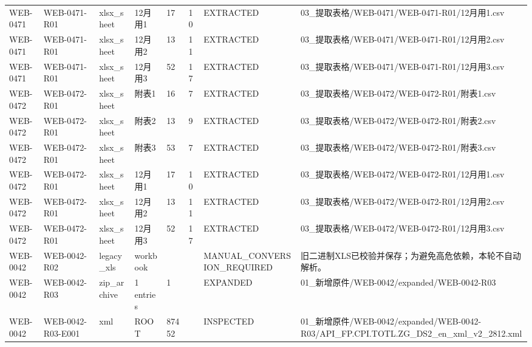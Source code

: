 \begin{landscape}
\begin{longtable}{p{1.8cm}p{2.2cm}p{3.1cm}p{4.7cm}p{1.3cm}p{1.3cm}p{3.0cm}p{5.3cm}}
WEB-0471 & WEB-0471-R01 & xlsx\_\allowbreak{}sheet & 12月用1 & 17 & 10 & EXTRACTED & 03\_\allowbreak{}提取表格/\allowbreak{}WEB-0471/\allowbreak{}WEB-0471-R01/\allowbreak{}12月用1.csv\\
WEB-0471 & WEB-0471-R01 & xlsx\_\allowbreak{}sheet & 12月用2 & 13 & 11 & EXTRACTED & 03\_\allowbreak{}提取表格/\allowbreak{}WEB-0471/\allowbreak{}WEB-0471-R01/\allowbreak{}12月用2.csv\\
WEB-0471 & WEB-0471-R01 & xlsx\_\allowbreak{}sheet & 12月用3 & 52 & 17 & EXTRACTED & 03\_\allowbreak{}提取表格/\allowbreak{}WEB-0471/\allowbreak{}WEB-0471-R01/\allowbreak{}12月用3.csv\\
WEB-0472 & WEB-0472-R01 & xlsx\_\allowbreak{}sheet & 附表1 & 16 & 7 & EXTRACTED & 03\_\allowbreak{}提取表格/\allowbreak{}WEB-0472/\allowbreak{}WEB-0472-R01/\allowbreak{}附表1.csv\\
WEB-0472 & WEB-0472-R01 & xlsx\_\allowbreak{}sheet & 附表2 & 13 & 9 & EXTRACTED & 03\_\allowbreak{}提取表格/\allowbreak{}WEB-0472/\allowbreak{}WEB-0472-R01/\allowbreak{}附表2.csv\\
WEB-0472 & WEB-0472-R01 & xlsx\_\allowbreak{}sheet & 附表3 & 53 & 7 & EXTRACTED & 03\_\allowbreak{}提取表格/\allowbreak{}WEB-0472/\allowbreak{}WEB-0472-R01/\allowbreak{}附表3.csv\\
WEB-0472 & WEB-0472-R01 & xlsx\_\allowbreak{}sheet & 12月用1 & 17 & 10 & EXTRACTED & 03\_\allowbreak{}提取表格/\allowbreak{}WEB-0472/\allowbreak{}WEB-0472-R01/\allowbreak{}12月用1.csv\\
WEB-0472 & WEB-0472-R01 & xlsx\_\allowbreak{}sheet & 12月用2 & 13 & 11 & EXTRACTED & 03\_\allowbreak{}提取表格/\allowbreak{}WEB-0472/\allowbreak{}WEB-0472-R01/\allowbreak{}12月用2.csv\\
WEB-0472 & WEB-0472-R01 & xlsx\_\allowbreak{}sheet & 12月用3 & 52 & 17 & EXTRACTED & 03\_\allowbreak{}提取表格/\allowbreak{}WEB-0472/\allowbreak{}WEB-0472-R01/\allowbreak{}12月用3.csv\\
WEB-0042 & WEB-0042-R02 & legacy\_\allowbreak{}xls & workbook &  &  & MANUAL\_\allowbreak{}CONVERSION\_\allowbreak{}REQUIRED & 旧二进制XLS已校验并保存；为避免高危依赖，本轮不自动解析。\\
WEB-0042 & WEB-0042-R03 & zip\_\allowbreak{}archive & 1 entries & 1 &  & EXPANDED & 01\_\allowbreak{}新增原件/\allowbreak{}WEB-0042/\allowbreak{}expanded/\allowbreak{}WEB-0042-R03\\
WEB-0042 & WEB-0042-R03-E001 & xml & ROOT & 87452 &  & INSPECTED & 01\_\allowbreak{}新增原件/\allowbreak{}WEB-0042/\allowbreak{}expanded/\allowbreak{}WEB-0042-R03/\allowbreak{}API\_\allowbreak{}FP.CPI.TOTL.ZG\_\allowbreak{}DS2\_\allowbreak{}en\_\allowbreak{}xml\_\allowbreak{}v2\_\allowbreak{}2812.xml\\

\end{longtable}
\end{landscape}
